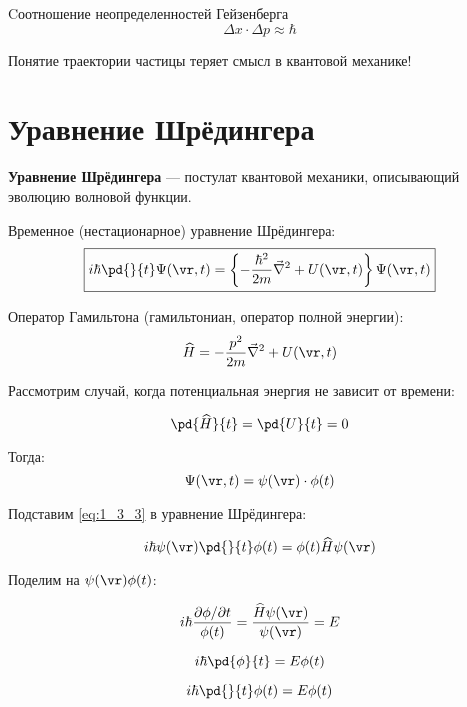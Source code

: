 Cоотношение неопределенностей Гейзенберга
\begin{equation}
\label{eq:1_2_10}
\boxed{\Delta x \cdot \Delta p \approx \hbar}
\end{equation}

Понятие траектории частицы теряет смысл в квантовой механике!

\section{Уравнение Шрёдингера}

\textbf{Уравнение Шрёдингера} --- постулат квантовой механики, описывающий эволюцию волновой функции.

Временное (нестационарное) уравнение Шрёдингера:\\
\begin{equation}
\label{eq:1_3_1}
\boxed{i \hbar \pd{}{t} \Psi(\vr,t) = \left\{ -\frac{\hbar^2}{2m}\vec{\nabla}^2 + U(\vr,t) \right\} \Psi(\vr,t)} 
\end{equation}

Оператор Гамильтона (гамильтониан, оператор полной энергии):\\
\begin{equation}
\label{eq:1_3_2}
\widehat{H} = -\frac{p^2}{2m}\vec{\nabla}^2 + U(\vr,t)
\end{equation}

Рассмотрим случай, когда потенциальная энергия не зависит от времени:

$$\pd{\widehat{H}}{t} = \pd{U}{t} = 0 $$

Тогда:\\
\begin{equation}
\label{eq:1_3_3}
\Psi(\vr,t) = \psi(\vr) \cdot \phi (t)
\end{equation}

Подставим \eqref{eq:1_3_3} в уравнение Шрёдингера:

$$i \hbar \psi(\vr) \pd{}{t} \phi (t) = \phi (t) \widehat{H} \psi(\vr)$$

Поделим на $\psi(\vr)\phi(t)$:

$$i \hbar \frac{\partial \phi / \partial t}{\phi(t)} = \frac{\widehat{H} \psi(\vr)}{\psi(\vr)} = E$$

\begin{equation}
\label{eq:1_3_4}
i \hbar \pd{\phi}{t} = E \phi(t)
\end{equation}

\begin{equation}
\label{eq:1_3_5}
i \hbar \pd{}{t} \phi(t) = E \phi(t)
\end{equation}

